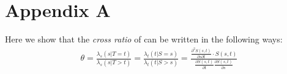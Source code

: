 \documentclass[]{article}
\begin{document}
%
%
%


%


\clearpage

\section*{Appendix A} \label{appendixA}
Here we show that the \emph{cross ratio} of \cite{clayton1978model} can be written in the following ways:
	$$
	\begin{aligned}
	  \theta = \frac{ \lambda_s(s|T=t)}{\lambda_s(s|T>t)} = \frac{ \lambda_t(t|S=s)}{\lambda_t(t|S>s)} = \frac{ \frac{\partial^2 S(s, t)}{\partial s\partial t} \cdot S(s, t)}    {\frac{\partial S(s, t)}{\partial t} \frac{\partial S(s, t)}{\partial s}}
	\end{aligned}
	$$
\end{document}
